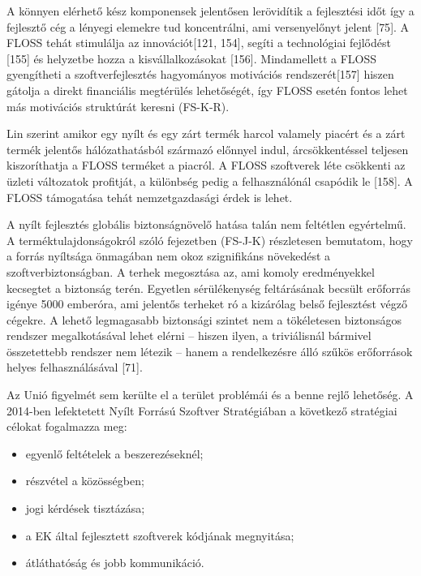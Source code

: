 \documentclass[12pt,magyar,a4paper,oneside]{scrreprt}
\providecommand{\tightlist}{%
  \setlength{\itemsep}{0pt}\setlength{\parskip}{0pt}}
\begin{document}
A könnyen elérhető kész komponensek jelentősen lerövidítik a fejlesztési
időt így a fejlesztő cég a lényegi elemekre tud koncentrálni, ami
versenyelőnyt jelent {[}75{]}. A FLOSS tehát stimulálja az
innovációt{[}121, 154{]}, segíti a technológiai fejlődést {[}155{]} és
helyzetbe hozza a kisvállalkozásokat {[}156{]}. Mindamellett a FLOSS
gyengítheti a szoftverfejlesztés hagyományos motivációs
rendszerét{[}157{]} hiszen gátolja a direkt financiális megtérülés
lehetőségét, így FLOSS esetén fontos lehet más motivációs struktúrát
keresni (FS-K-R).

Lin szerint amikor egy nyílt és egy zárt termék harcol valamely piacért
és a zárt termék jelentős hálózathatásból származó előnnyel indul,
árcsökkentéssel teljesen kiszoríthatja a FLOSS terméket a piacról. A
FLOSS szoftverek léte csökkenti az üzleti változatok profitját, a
különbség pedig a felhasználónál csapódik le {[}158{]}. A FLOSS
támogatása tehát nemzetgazdasági érdek is lehet.

A nyílt fejlesztés globális biztonságnövelő hatása talán nem feltétlen
egyértelmű. A terméktulajdonságokról szóló fejezetben (FS-J-K)
részletesen bemutatom, hogy a forrás nyíltsága önmagában nem okoz
szignifikáns növekedést a szoftverbiztonságban. A terhek megosztása az,
ami komoly eredményekkel kecsegtet a biztonság terén. Egyetlen
sérülékenység feltárásának becsült erőforrás igénye 5000 emberóra, ami
jelentős terheket ró a kizárólag belső fejlesztést végző cégekre. A
lehető legmagasabb biztonsági szintet nem a tökéletesen biztonságos
rendszer megalkotásával lehet elérni -- hiszen ilyen, a triviálisnál
bármivel összetettebb rendszer nem létezik -- hanem a rendelkezésre álló
szűkös erőforrások helyes felhasználásával {[}71{]}.

Az Unió figyelmét sem kerülte el a terület problémái és a benne rejlő
lehetőség. A 2014-ben lefektetett Nyílt Forrású Szoftver Stratégiában a
következő stratégiai célokat fogalmazza meg:

\begin{itemize}
\tightlist
\item
  egyenlő feltételek a beszerezéseknél;
\item
  részvétel a közösségben;
\item
  jogi kérdések tisztázása;
\item
  a EK által fejlesztett szoftverek kódjának megnyitása;
\item
  átláthatóság és jobb kommunikáció.
\end{itemize}
\end{document}
